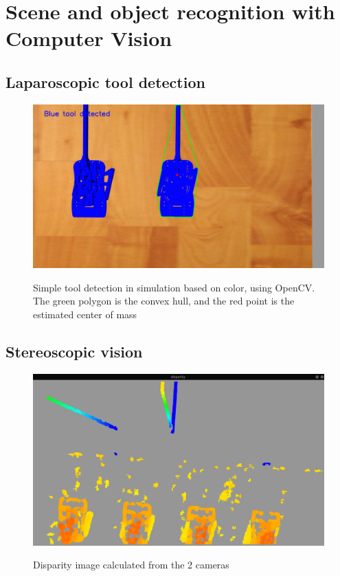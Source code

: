 \section{Scene and object recognition with Computer Vision}

\subsection{Laparoscopic tool detection}

\begin{center}
\begin{figure}[H]
\centering
\includegraphics[width=12cm]{images/opencv-tool-convex-hull.png}\\
\caption{Simple tool detection in simulation based on color, using OpenCV. The green polygon is the convex hull, and the red point is the
estimated center of mass}
\end{figure}
\end{center}

\subsection{Stereoscopic vision}

\begin{center}
\begin{figure}[H]
\centering
\includegraphics[width=12cm]{images/disparity.png}\\
\caption{Disparity image calculated from the 2 cameras}
\end{figure}
\end{center}

